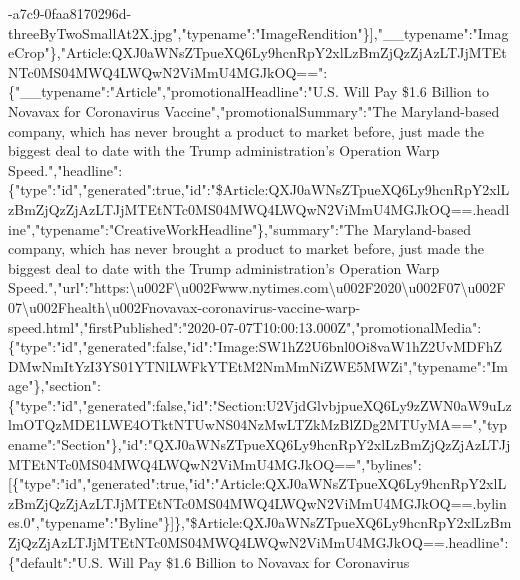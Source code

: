 -a7c9-0faa8170296d-threeByTwoSmallAt2X.jpg","typename":"ImageRendition"\}{]},"\_\_typename":"ImageCrop"\},"Article:QXJ0aWNsZTpueXQ6Ly9hcnRpY2xlLzBmZjQzZjAzLTJjMTEtNTc0MS04MWQ4LWQwN2ViMmU4MGJkOQ==":\{"\_\_typename":"Article","promotionalHeadline":"U.S.
Will Pay \$1.6 Billion to Novavax for Coronavirus
Vaccine","promotionalSummary":"The Maryland-based company, which has
never brought a product to market before, just made the biggest deal to
date with the Trump administration's Operation Warp
Speed.","headline":\{"type":"id","generated":true,"id":"\$Article:QXJ0aWNsZTpueXQ6Ly9hcnRpY2xlLzBmZjQzZjAzLTJjMTEtNTc0MS04MWQ4LWQwN2ViMmU4MGJkOQ==.headline","typename":"CreativeWorkHeadline"\},"summary":"The
Maryland-based company, which has never brought a product to market
before, just made the biggest deal to date with the Trump
administration's Operation Warp
Speed.","url":"https:\textbackslash{}u002F\textbackslash{}u002Fwww.nytimes.com\textbackslash{}u002F2020\textbackslash{}u002F07\textbackslash{}u002F07\textbackslash{}u002Fhealth\textbackslash{}u002Fnovavax-coronavirus-vaccine-warp-speed.html","firstPublished":"2020-07-07T10:00:13.000Z","promotionalMedia":\{"type":"id","generated":false,"id":"Image:SW1hZ2U6bnl0Oi8vaW1hZ2UvMDFhZDMwNmItYzI3YS01YTNlLWFkYTEtM2NmMmNiZWE5MWZi","typename":"Image"\},"section":\{"type":"id","generated":false,"id":"Section:U2VjdGlvbjpueXQ6Ly9zZWN0aW9uLzlmOTQzMDE1LWE4OTktNTUwNS04NzMwLTZkMzBlZDg2MTUyMA==","typename":"Section"\},"id":"QXJ0aWNsZTpueXQ6Ly9hcnRpY2xlLzBmZjQzZjAzLTJjMTEtNTc0MS04MWQ4LWQwN2ViMmU4MGJkOQ==","bylines":{[}\{"type":"id","generated":true,"id":"Article:QXJ0aWNsZTpueXQ6Ly9hcnRpY2xlLzBmZjQzZjAzLTJjMTEtNTc0MS04MWQ4LWQwN2ViMmU4MGJkOQ==.bylines.0","typename":"Byline"\}{]}\},"\$Article:QXJ0aWNsZTpueXQ6Ly9hcnRpY2xlLzBmZjQzZjAzLTJjMTEtNTc0MS04MWQ4LWQwN2ViMmU4MGJkOQ==.headline":\{"default":"U.S.
Will Pay \$1.6 Billion to Novavax for Coronavirus

